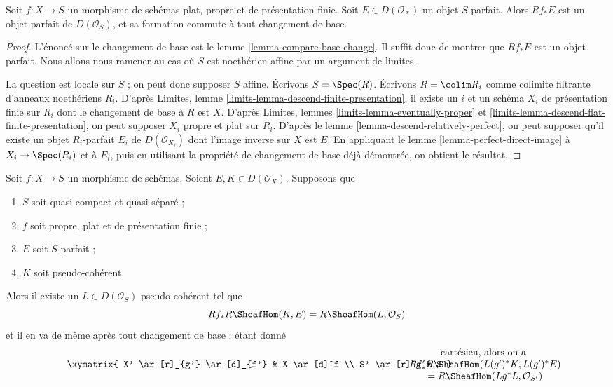 \begin{lemma}
\label{lemma-derived-pushforward-rel-perfect}
Soit $f : X \to S$ un morphisme de schémas plat, propre et
de présentation finie. Soit $E \in D(\mathcal{O}_X)$ un objet $S$-parfait.
Alors $Rf_*E$ est un objet parfait de $D(\mathcal{O}_S)$,
et sa formation commute à tout changement de base.
\end{lemma}

\begin{proof}
L'énoncé sur le changement de base est le lemme \ref{lemma-compare-base-change}.
Il suffit donc de montrer que $Rf_*E$ est un objet parfait. Nous allons nous ramener
au cas où $S$ est noethérien affine par un argument de limites.

\medskip\noindent
La question est locale sur $S$ ; on peut donc supposer $S$ affine.
Écrivons $S = \Spec(R)$. Écrivons $R = \colim R_i$ comme colimite filtrante
d'anneaux noethériens $R_i$. D'après Limites, lemme
\ref{limits-lemma-descend-finite-presentation},
il existe un $i$ et un schéma $X_i$ de présentation finie sur $R_i$
dont le changement de base à $R$ est $X$. D'après
Limites, lemmes \ref{limits-lemma-eventually-proper} et
\ref{limits-lemma-descend-flat-finite-presentation},
on peut supposer $X_i$ propre et plat sur $R_i$.
D'après le lemme \ref{lemma-descend-relatively-perfect},
on peut supposer qu'il existe un objet $R_i$-parfait $E_i$ de
$D(\mathcal{O}_{X_i})$ dont l'image inverse sur $X$ est $E$.
En appliquant le lemme \ref{lemma-perfect-direct-image}
à $X_i \to \Spec(R_i)$ et à $E_i$, puis en utilisant la
propriété de changement de base déjà démontrée, on obtient le résultat.
\end{proof}

\begin{lemma}
\label{lemma-compute-ext-rel-perfect}
Soit $f : X \to S$ un morphisme de schémas. Soient $E, K \in D(\mathcal{O}_X)$.
Supposons que
\begin{enumerate}
\item $S$ soit quasi-compact et quasi-séparé ;
\item $f$ soit propre, plat et de présentation finie ;
\item $E$ soit $S$-parfait ;
\item $K$ soit pseudo-cohérent.
\end{enumerate}
Alors il existe un $L \in D(\mathcal{O}_S)$ pseudo-cohérent tel que
$$
Rf_*R\SheafHom(K, E) = R\SheafHom(L, \mathcal{O}_S)
$$
et il en va de même après tout changement de base : étant donné
$$
\vcenter{
\xymatrix{
X' \ar[r]_{g'} \ar[d]_{f'} &
X \ar[d]^f \\
S' \ar[r]^g &
S
}
}
\quad\quad
\begin{matrix}
\text{cartésien, alors on a } \\
Rf'_*R\SheafHom(L(g')^*K, L(g')^*E) \\
= R\SheafHom(Lg^*L, \mathcal{O}_{S'})
\end{matrix}
$$
\end{lemma}

